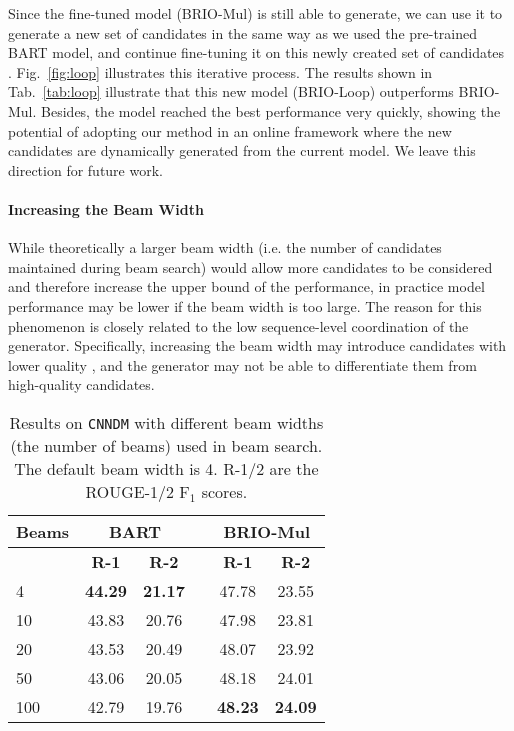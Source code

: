 \documentclass[11pt]{article}
\newcommand{\model}{BRIO\xspace}
\begin{document}
Since the fine-tuned model (\model-Mul) is still able to generate, we can use it to generate a new set of candidates in the same way as we used the pre-trained BART model, and continue fine-tuning it on this newly created set of candidates \citep{och-2003-minimum}. 
Fig.~\ref{fig:loop} illustrates this iterative process.
The results shown in Tab.~\ref{tab:loop} illustrate that this new model (\model-Loop) outperforms \model-Mul.
Besides, the model reached the best performance very quickly, showing the potential of adopting our method in an online framework where the new candidates are dynamically generated from the current model.
We leave this direction for future work.


\paragraph{Increasing the Beam Width}

While theoretically a larger beam width (i.e. the number of candidates maintained during beam search) would allow more candidates to be considered and therefore increase the upper bound of the performance, in practice model performance may be lower if the beam width is too large.
The reason for this phenomenon is closely related to the low sequence-level coordination of the generator.
Specifically, increasing the beam width may introduce candidates with lower quality \citep{stahlberg-byrne-2019-nmt}, and the generator may not be able to differentiate them from high-quality candidates.

\begin{table}[t!]
\centering
\small
\begin{tabular}{lccccc}
\toprule
 \textbf{Beams} & \multicolumn{2}{c}{\textbf{BART}} & & \multicolumn{2}{c}{\textbf{\model-Mul}} \\
 \midrule
 & \textbf{R-1} & \textbf{R-2} & & \textbf{R-1} & \textbf{R-2} \\
\cmidrule{2-3} \cmidrule{5-6}

 4 & \textbf{44.29} & \textbf{21.17} &  & 47.78 & 23.55  \\
 10 & 43.83 & 20.76 &  & 47.98 & 23.81  \\
 20 & 43.53 & 20.49 & & 48.07 & 23.92  \\
 50 & 43.06 & 20.05 &  & 48.18 & 24.01 \\
 100 & 42.79 & 19.76 &  & \textbf{48.23} & \textbf{24.09} \\
\bottomrule
\end{tabular}
\caption{\label{tab:num_beams} Results on \texttt{CNNDM} with different beam widths (the number of beams) used in beam search.
The default beam width is 4.
R-1/2 are the ROUGE-1/2 F$_1$ scores.
}
\end{table}
\end{document}
